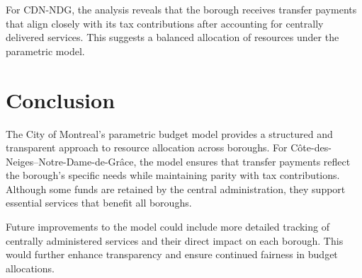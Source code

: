 \documentclass{article}
\begin{document}
For CDN-NDG, the analysis reveals that the borough receives transfer payments that align closely with its tax contributions after accounting for centrally delivered services. This suggests a balanced allocation of resources under the parametric model.

\section{Conclusion}
The City of Montreal's parametric budget model provides a structured and transparent approach to resource allocation across boroughs. For Côte-des-Neiges–Notre-Dame-de-Grâce, the model ensures that transfer payments reflect the borough's specific needs while maintaining parity with tax contributions. Although some funds are retained by the central administration, they support essential services that benefit all boroughs.

Future improvements to the model could include more detailed tracking of centrally administered services and their direct impact on each borough. This would further enhance transparency and ensure continued fairness in budget allocations.
\end{document}

